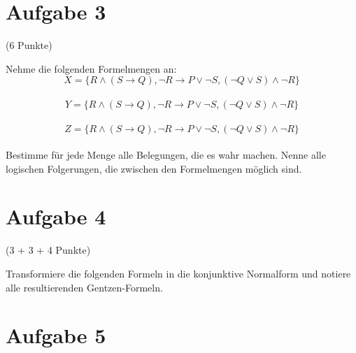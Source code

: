 \documentclass{exam}
\newcommand{\Punkte}[1]{\begin{flushright}(#1 Punkte)\end{flushright}}
\begin{document}
	\clearpage
	\section{Aufgabe 3}
		
	\Punkte{6}
	
	Nehme die folgenden Formelmengen an:\\
	$$ X = \{ R \land (S \rightarrow Q), \lnot R \rightarrow P \lor \lnot S, (\lnot Q \lor S) \land \lnot R \} $$\\
	$$ Y = \{ R \land (S \rightarrow Q), \lnot R \rightarrow P \lor \lnot S, (\lnot Q \lor S) \land \lnot R \} $$\\
	$$ Z = \{ R \land (S \rightarrow Q), \lnot R \rightarrow P \lor \lnot S, (\lnot Q \lor S) \land \lnot R \} $$\\
	Bestimme für jede Menge alle Belegungen, die es wahr machen. Nenne alle logischen Folgerungen, die zwischen den Formelmengen möglich sind.
	
	
	\clearpage
	\section{Aufgabe 4}
	
	\Punkte{3 + 3 + 4}
	
	Transformiere die folgenden Formeln in die konjunktive Normalform und notiere alle resultierenden Gentzen-Formeln.\\
	
	
	
	\clearpage
	\section{Aufgabe 5}
	
\end{document}
